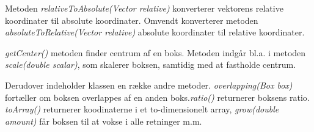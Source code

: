 Metoden \emph{relativeToAbsolute(Vector relative)} konverterer vektorens relative koordinater til absolute koordinater. Omvendt konverterer metoden \emph{absoluteToRelative(Vector relative)} absolute koordinater til relative koordinater.

\emph{getCenter()} metoden finder centrum af en boks. Metoden indgår bl.a. i metoden \emph{scale(double scalar)}, som skalerer boksen, samtidig med at fastholde centrum. 

Derudover indeholder klassen en række andre metoder. \emph{overlapping(Box box)} fortæller om boksen overlappes af en anden boks.\emph{ratio()} returnerer boksens ratio.  \emph{toArray()} returnerer koodinaterne i et to-dimensionelt array, \emph{grow(double amount)} får boksen til at vokse i alle retninger m.m.